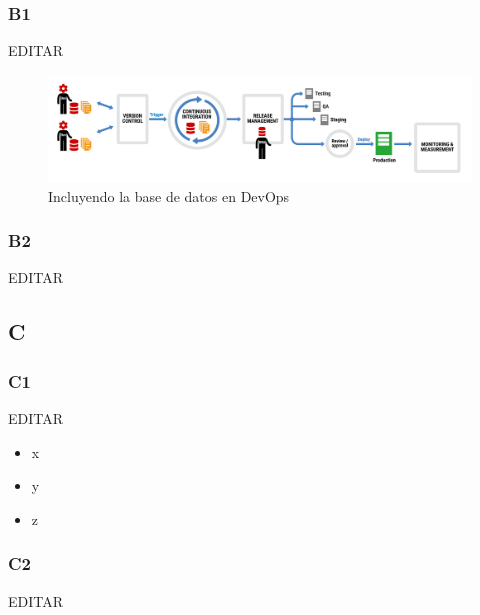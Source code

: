 \documentclass[preprint,12pt]{elsarticle}
\begin{document}
\subsubsection{\textbf{B1}}

EDITAR\\

\begin{figure}[htb]
	\begin{center}
		\includegraphics[width=14cm]{./IMAGENES/basededatos_1} 
		\caption{Incluyendo la base de datos en DevOps}
	\end{center}
\end{figure}

\subsubsection{\textbf{B2}}

EDITAR\\

\subsection{\textbf{C}}

\subsubsection{\textbf{C1}}

EDITAR\\

\begin{itemize}

\item x
\item y
\item z

\end{itemize}
\subsubsection{\textbf{C2}}

EDITAR\\
\end{document}
